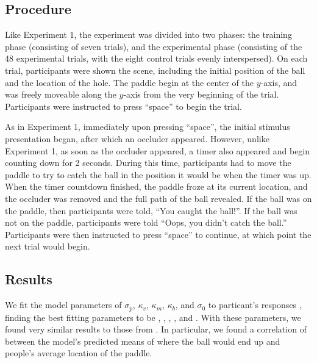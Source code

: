 \documentclass[10pt,letterpaper]{article}
\begin{document}
\subsection{Procedure}

Like Experiment 1, the experiment was divided into two phases: the training phase (consisting of seven trials), and the experimental phase (consisting of the 48 experimental trials, with the eight control trials evenly interspersed).
On each trial, participants were shown the scene, including the initial position of the ball and the location of the hole.
The paddle begin at the center of the $y$-axis, and was freely moveable along the $y$-axis from the very beginning of the trial.
Participants were instructed to press ``space'' to begin the trial. 

As in Experiment 1, immediately upon pressing ``space'', the initial stimulus presentation began, after which an occluder appeared.
However, unlike Experiment 1, as soon as the occluder appeared, a timer also appeared and begin counting down for 2 seconds.
During this time, participants had to move the paddle to try to catch the ball in the position it would be when the timer was up.
When the timer countdown finished, the paddle froze at its current location, and the occluder was removed and the full path of the ball revealed.
If the ball was on the paddle, then participants were told, ``You caught the ball!''.
If the ball was not on the paddle, participants were told ``Oops, you didn't catch the ball.''
Participants were then instructed to press ``space'' to continue, at which point the next trial would begin.

\subsection{Results}

We fit the model parameters of $\sigma_p$, $\kappa_v$, $\kappa_m$, $\kappa_b$, and $\sigma_0$ to particant's responses \cite<for details, see>{Smith:2013fc}, finding the best fitting parameters to be \perr{}, \kapv{}, \kapm{}, \kapb{}, and \sdzero{}. 
With these parameters, we found very similar results to those from .
In particular, we found a correlation of \PaddleCorr{} between the model's predicted means of where the ball would end up and people's average location of the paddle.



\setlength{\bibleftmargin}{.125in}
\setlength{\bibindent}{-\bibleftmargin}


\end{document}
